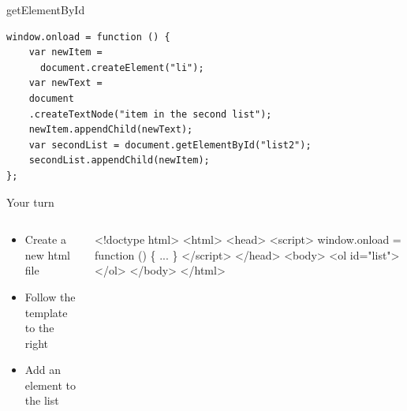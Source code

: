 \documentclass{beamer}
\begin{document}
\begin{frame}[fragile]{getElementById}
\begin{block}{}
 \begin{verbatim}
window.onload = function () {
    var newItem = 
      document.createElement("li");
    var newText =
	document
	.createTextNode("item in the second list");
    newItem.appendChild(newText);
    var secondList = document.getElementById("list2");
    secondList.appendChild(newItem);
};
\end{verbatim}
\end{block}
\end{frame}

\begin{frame}[fragile]{Your turn}
\begin{columns}[T]

\begin{column}{0.3\columnwidth}
  \begin{block}{}
    \begin{itemize}
      \item Create a new html file
      \item Follow the template to the right
      \item Add an element to the list
    \end{itemize}
  \end{block}
\end{column}

\begin{column}{0.65\columnwidth}
\begin{block}{}
  \begin{semiverbatim}
<!doctype html>
<html>
  <head>
    <script>
      window.onload = function () \{
        ...
      \}
    </script>
  </head>
  <body>
    <ol id="list">
    </ol>
  </body>
</html>
  \end{semiverbatim}
\end{block}
\end{column}
\end{columns}
\end{frame}

\end{document}
